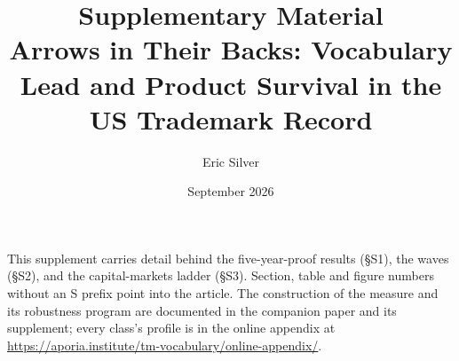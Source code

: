 
\usepackage{xr}

\newcommand{\onlineappendixnote}{\url{https://aporia.institute/tm-vocabulary/online-appendix/}}
\graphicspath{{../../}}
\makeatletter{}\makeatother
\renewcommand{\thesection}{S\arabic{section}}
\renewcommand{\thetable}{S\arabic{table}}
\renewcommand{\thefigure}{S\arabic{figure}}
\title{\bfseries Supplementary Material\\
\large Arrows in Their Backs: Vocabulary Lead and Product Survival in the
US Trademark Record}
\author{Eric Silver}
\date{September 2026}


\maketitle

\noindent This supplement carries detail behind the five-year-proof
results (\S S1), the waves (\S S2), and the capital-markets ladder
(\S S3). Section, table and figure numbers without an S prefix point
into the article. The construction of the measure and its robustness
program are documented in the companion paper and its supplement; every
class's profile is in the online appendix at
\url{https://aporia.institute/tm-vocabulary/online-appendix/}.




